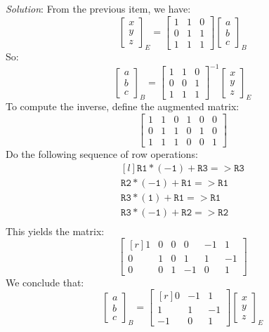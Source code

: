 \documentclass[12pt]{article}
\begin{document}
\begin{enumerate}
\emph{Solution}:
From the previous item, we have:
\[
\begin{bmatrix}x\\y\\z\end{bmatrix}_E=
\begin{bmatrix*}1&1&0\\0&1&1\\1&1&1\end{bmatrix*}
\begin{bmatrix}a\\b\\c\end{bmatrix}_B
\]
So:
\[
\begin{bmatrix}a\\b\\c\end{bmatrix}_B=
\begin{bmatrix*}1&1&0\\0&0&1\\1&1&1\end{bmatrix*}^{-1}
\begin{bmatrix}x\\y\\z\end{bmatrix}_E
\]
To compute the inverse, define the augmented matrix:
\[
\left[\begin{matrix}1 & 1 & 0 & 1 & 0 & 0\\0 & 1 & 1 & 0 & 1 & 0\\1 & 1 & 1 & 0 & 0 & 1\end{matrix}\right]
\]
Do the following sequence of row operations:
\[
\begin{matrix*}[l]
\mathtt{R1*(-1)+R3=>R3}\\
\mathtt{R2*(-1)+R1=>R1}\\
\mathtt{R3*(1)+R1=>R1}\\
\mathtt{R3*(-1)+R2=>R2}\\
\end{matrix*}
\]
This yields the matrix:
\[
\left[\begin{matrix*}[r]1 & 0 & 0 & 0 & -1 & 1\\0 & 1 & 0 & 1 & 1 & -1\\0 & 0 & 1 & -1 & 0 & 1\end{matrix*}\right]
\]
We conclude that:
\[
\begin{bmatrix}a\\b\\c\end{bmatrix}_B=
\left[\begin{matrix*}[r] 0 & -1 & 1\\ 1 & 1 & -1\\ -1 & 0 & 1\end{matrix*}\right]
\begin{bmatrix}x\\y\\z\end{bmatrix}_E
\]
\proofend


\end{enumerate}
\end{document}
